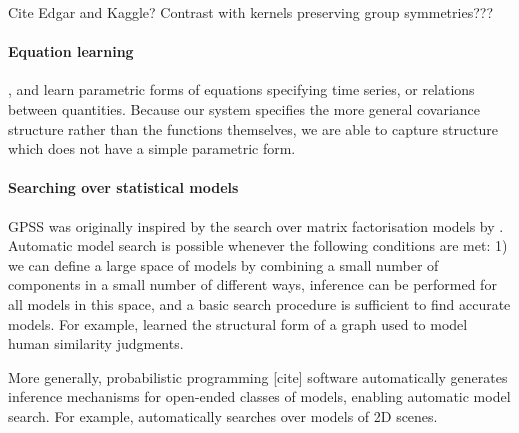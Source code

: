 \documentclass{article}
\def\eg{e.g.\ }
\begin{document}
Cite Edgar and Kaggle?
Contrast with kernels preserving group symmetries???

\paragraph{Equation learning}

\cite{schmidt2009distilling}, \cite{todorovski1997declarative} and \cite{washio1999discovering} learn parametric forms of equations specifying time series, or relations between quantities.  Because our system specifies the more general covariance structure rather than the functions themselves, we are able to capture structure which does not have a simple parametric form.

\paragraph{Searching over statistical models}

GPSS was originally inspired by the search over matrix factorisation models by \cite{grosse2012exploiting}.
Automatic model search is possible whenever the following conditions are met: 1) we can define a large space of models by combining a small number of components in a small number of different ways, inference can be performed for all models in this space, and a basic search procedure is sufficient to find accurate models.  For example, \citet{kemp2008discovery} learned the structural form of a graph used to model human similarity judgments.  

More generally, probabilistic programming [cite] software automatically generates inference mechanisms for open-ended classes of models, enabling automatic model search.  For example, \cite{VikashScene13} automatically searches over models of 2D scenes.


\end{document}
